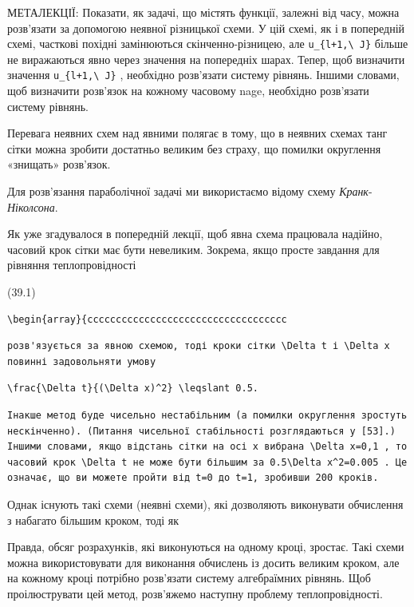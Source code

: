 \documentclass[
  ukrainian,
]{article}
\begin{document}
МЕТАЛЕКЦІЇ: Показати, як задачі, що містять функції, залежні від часу,
можна розв'язати за допомогою неявної різницької схеми. У цій схемі, як
і в попередній схемі, часткові похідні замінюються скінченно-різницею,
але \texttt{u\_\{l+1,\textbackslash{}\ J\}} більше не виражаються явно
через значення на попередніх шарах. Тепер, щоб визначити значення
\texttt{u\_\{l+1,\textbackslash{}\ J\}} , необхідно розв'язати систему
рівнянь. Іншими словами, щоб визначити розв'язок на кожному часовому
nage, необхідно розв'язати систему рівнянь.

Перевага неявних схем над явними полягає в тому, що в неявних схемах
танг сітки можна зробити достатньо великим без страху, що помилки
округлення «знищать» розв'язок.

Для розв'язання параболічної задачі ми використаємо відому схему
\emph{Кранк}-\emph{Ніколсона}.

Як уже згадувалося в попередній лекції, щоб явна схема працювала
надійно, часовий крок сітки має бути невеликим. Зокрема, якщо просте
завдання для рівняння теплопровідності

(39.1)

\begin{verbatim}
\begin{array}{ccccccccccccccccccccccccccccccccccc
\end{verbatim}

\begin{verbatim}
розв'язується за явною схемою, тоді кроки сітки \Delta t і \Delta x повинні задовольняти умову
\end{verbatim}

\begin{verbatim}
\frac{\Delta t}{(\Delta x)^2} \leqslant 0.5.
\end{verbatim}

\begin{verbatim}
Інакше метод буде чисельно нестабільним (а помилки округлення зростуть нескінченно). (Питання чисельної стабільності розглядаються у [53].) Іншими словами, якщо відстань сітки на осі x вибрана \Delta x=0,1 , то часовий крок \Delta t не може бути більшим за 0.5\Delta x^2=0.005 . Це означає, що ви можете пройти від t=0 до t=1, зробивши 200 кроків.
\end{verbatim}

Однак існують такі схеми (неявні схеми), які дозволяють виконувати
обчислення з набагато більшим кроком, тоді як

Правда, обсяг розрахунків, які виконуються на одному кроці, зростає.
Такі схеми можна використовувати для виконання обчислень із досить
великим кроком, але на кожному кроці потрібно розв'язати систему
алгебраїмних рівнянь. Щоб проілюструвати цей метод, розв'яжемо наступну
проблему теплопровідності.
\end{document}
